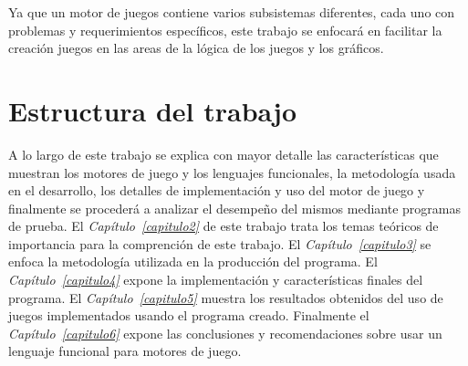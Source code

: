 Ya que un motor de juegos contiene varios subsistemas diferentes, cada uno con problemas y requerimientos específicos, este trabajo se enfocará en facilitar la creación juegos en las areas de la lógica de los juegos y los gráficos.

\section{Estructura del trabajo}

A lo largo de este trabajo se explica con mayor detalle las características que muestran los motores de juego y los lenguajes funcionales, la metodología usada en el desarrollo, los detalles de implementación y uso del motor de juego y finalmente se procederá a analizar el desempeño del mismos mediante programas de prueba. El \emph{Capítulo~\ref{capitulo2}} de este trabajo trata los temas teóricos de importancia para la comprención de este trabajo. El \emph{Capítulo~\ref{capitulo3}} se enfoca la metodología utilizada en la producción del programa. El \emph{Capítulo~\ref{capitulo4}} expone la implementación y características finales del programa. El \emph{Capítulo~\ref{capitulo5}} muestra los resultados obtenidos del uso de juegos implementados usando el programa creado. Finalmente el \emph{Capítulo~\ref{capitulo6}} expone las conclusiones y recomendaciones sobre usar un lenguaje funcional para motores de juego.
